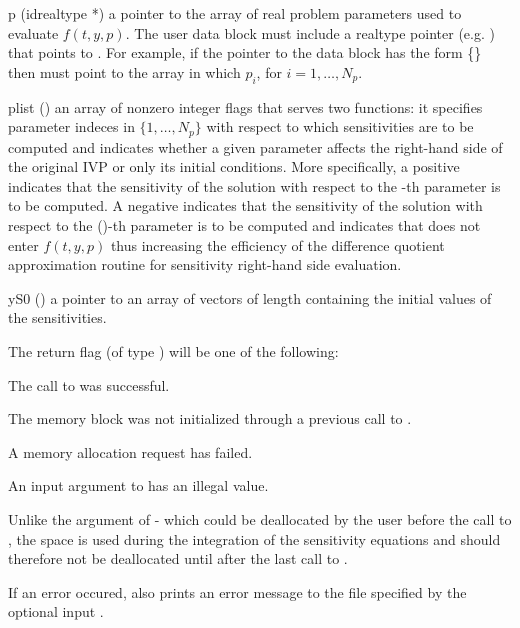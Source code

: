 {\begin{args}
  \item[p] (id{realtype *})
    a pointer to the array of real problem parameters used to evaluate $f(t,y,p)$.
    The user data block  must include a realtype pointer (e.g. )
    that points to . For example, if the pointer to the data block has the 
    form \{\} 
    then  must point to the array in which 
     $p_i$, for $i=1,\ldots,N_p$.
    
  \item[plist] () 
    an array of  nonzero integer flags that serves two functions:
    it specifies parameter indeces in $\{1,\ldots,N_p\}$  
    with respect to which sensitivities are to be computed
    and indicates whether a given parameter affects the right-hand side of the original
    IVP or only its initial conditions.
    More specifically, a positive  indicates that the sensitivity
    of the solution with respect to the -th parameter  is to be computed.
    A negative  indicates that the sensitivity of the solution with
    respect to the ()-th parameter  is to be computed and indicates
    that  does not enter $f(t,y,p)$ thus increasing the efficiency of the
    difference quotient approximation routine for sensitivity right-hand side evaluation.
    
  \item[yS0] () 
    a pointer to an array of  vectors of length  containing the initial 
    values of the sensitivities.

  \end{args}
}
{
  The return flag  (of type ) will be one of the following:
  \begin{args}
  \item[\Id{SUCCESS}]
    The call to  was successful.
  \item[\Id{SCVM\_NO\_MEM}] 
    The {\cvodes} memory block was not initialized through a 
    previous call to .
  \item[\Id{SCVM\_MEM\_FAIL}] 
    A memory allocation request has failed.
  \item[\Id{SCVM\_ILL\_INPUT}] 
    An input argument to  has an illegal value.
  \end{args}
}
{
  Unlike the argument  of  - which could be deallocated
  by the user before the call to , the space  is used during the
  integration of the sensitivity equations and should therefore not be deallocated 
  until after the last call to .

  If an error occured,  also prints an error message to the
  file specified by the optional input .
}
